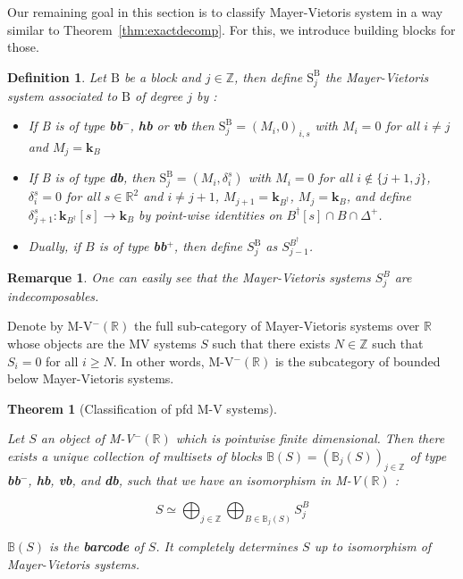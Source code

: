 \documentclass[a4paper, english, 11pt]{article}
\newcommand{\kk}[0]{\textbf{k}}
\newcommand{\0}{\vec{0}}
\newcommand{\R}[0]{\mathbb{R}}
\newcommand{\Z}[0]{\mathbb{Z}}
\newtheorem{rem}[prop]{Remarque}
\newtheorem{defi}[prop]{Definition}
\newtheorem{thm}[prop]{Theorem}
\begin{document}
Our remaining goal in this section is to classify Mayer-Vietoris system in a way similar to Theorem~\ref{thm:exactdecomp}. For this, we introduce building blocks for those.
\begin{defi}\label{D:blocksmodulesforMV}
Let $\text{B}$ be a block and $j\in \Z$, then define $\text{S}^\text{B}_j$ the Mayer-Vietoris system associated to $\text{B}$ of degree $j$ by : 

\begin{itemize}
    \item If B is of type \textbf{bb}$^-$, \textbf{hb} or \textbf{vb} then $\text{S}^\text{B}_j = (M_i,0)_{i,s}$ with $M_i = 0$ for all $i\not = j$ and $M_j = \kk_B$
    
    \item If B is of type \textbf{db}, then $\text{S}^\text{B}_j = (M_i,\delta_i^s)$ with $M_i = 0$ for all $i\not \in \{j+1,j\} $, $\delta_i^s=0$ for all $s\in \R^2$ and $i\not = j+1$,  $M_{j+1} = \kk_{B^\dag}$, $M_{j}= \kk_{B}$, and define $\delta_{j+1}^s : \kk_{B^\dag}[s] \to \kk_B$ by point-wise identities on $B^\dag [s]\cap B \cap \Delta^+$.

    \item Dually, if $B$ is of type \textbf{bb$^+$}, then define $S^{\text{B}}_j$ as $S^{B^\dag}_{j-1}$.
\end{itemize}  
\end{defi}


\begin{rem}
One can easily see that the Mayer-Vietoris systems $S_j^B$ are indecomposables.
\end{rem}

Denote by M-V$^- (\R)$ the full sub-category of Mayer-Vietoris systems over $\R$ whose objects are the MV systems $S$ such that there exists $N\in\Z$ such that $S_i = 0$ for all $i\geq N$. In other words, M-V$^- (\R)$ is the subcategory of bounded below Mayer-Vietoris systems.

\begin{thm}[Classification of pfd M-V systems]\label{thm:decom_MV}

Let $S$ an object of M-V$^- (\R)$ which is pointwise finite dimensional.  Then there exists a unique collection of multisets of blocks $\mathbb{B}(S) = (\mathbb{B}_j(S))_{j\in \Z}$ of type \textbf{bb$^-$}, \textbf{hb}, \textbf{vb}, and \textbf{db}, such that we have an isomorphism in M-V$(\R)$ : 

$$S \simeq \bigoplus_{j\in \Z} \bigoplus_{B\in \mathbb{B}_j(S)} S_j^B $$

$\mathbb{B}(S)$ is the \textbf{barcode} of $S$. It completely determines $S$ up to isomorphism of Mayer-Vietoris systems.
\end{thm}
\end{document}
